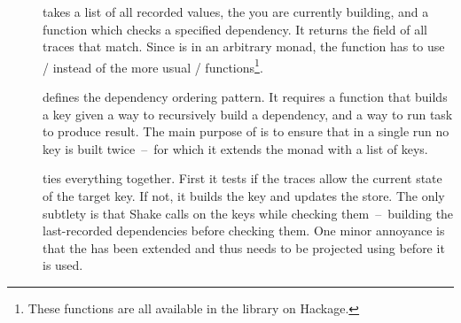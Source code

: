 \begin{description}
\item[] takes a list of all recorded  values, the  you are currently building, and a function  which checks a specified dependency. It returns the  field of all traces that match. Since  is in an arbitrary monad, the function has to use /\hs{&&^} instead of the more usual /\hs{&&} functions\footnote{These functions are all available in the  library on Hackage.}.
\item[] defines the dependency ordering pattern. It requires a  function that builds a key given a way to recursively build a dependency, and a way to run task to produce result. The main purpose of  is to ensure that in a single run no key is built twice~--~for which it extends the  monad with a list of  keys.
\item[] ties everything together. First it tests if the traces allow the current state of the target key. If not, it builds the key and updates the store. The only subtlety is that Shake calls  on the keys while checking them~--~building the last-recorded dependencies before checking them. One minor annoyance is that the  has been extended and thus needs to be projected using  before it is used.
\end{description}

